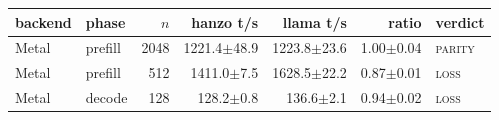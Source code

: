 \begin{tabular}{@{}llrrrrl@{}}
\toprule
backend & phase & $n$ & hanzo t/s & llama t/s & ratio & verdict \\
\midrule
Metal & prefill & 2048 & 1221.4$\pm$48.9 & 1223.8$\pm$23.6 & 1.00$\pm$0.04 & \textsc{parity} \\
Metal & prefill & 512 & 1411.0$\pm$7.5 & 1628.5$\pm$22.2 & 0.87$\pm$0.01 & \textsc{loss} \\
Metal & decode & 128 & 128.2$\pm$0.8 & 136.6$\pm$2.1 & 0.94$\pm$0.02 & \textsc{loss} \\
\bottomrule
\end{tabular}
